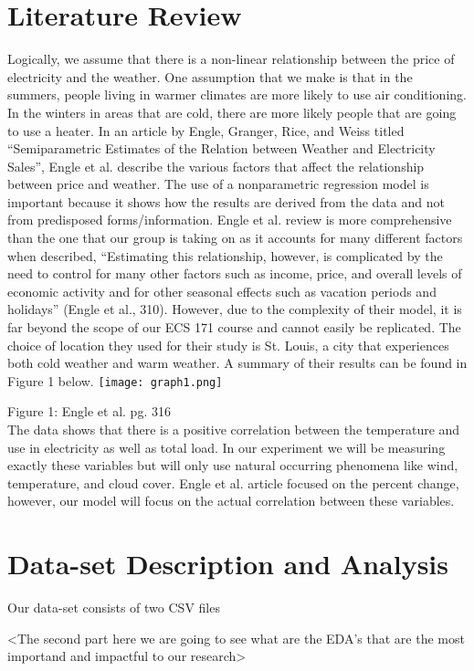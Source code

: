 \documentclass[10pt]{article}
\begin{document}
\section{Literature Review}\label{sec:2}
Logically, we assume that there is a non-linear relationship between the price of electricity and the weather. One assumption that we make is that in the summers, people living in warmer climates are more likely to use air conditioning. In the winters in areas that are cold, there are more likely people that are going to use a heater. In an article by Engle, Granger, Rice, and Weiss titled “Semiparametric Estimates of the Relation between Weather and Electricity Sales”, Engle et al. describe the various factors that affect the relationship between price and weather. The use of a nonparametric regression model is important because it shows how the results are derived from the data and not from predisposed forms/information. Engle et al. review is more comprehensive than the one that our group is taking on as it accounts for many different factors when described, “Estimating this relationship, however, is complicated by the need to control for many other factors such as income, price, and overall levels of economic activity and for other seasonal effects such as vacation periods and holidays” (Engle et al., 310). However, due to the complexity of their model, it is far beyond the scope of our ECS 171 course and cannot easily be replicated. The choice of location they used for their study is St. Louis, a city that experiences both cold weather and warm weather. A summary of their results can be found in Figure 1 below.
\texttt{[image: graph1.png]}

Figure 1: Engle et al. pg. 316
\\The data shows that there is a positive correlation between the temperature and use in electricity as well as total load. In our experiment we will be measuring exactly these variables but will only use natural occurring phenomena like wind, temperature, and cloud cover. Engle et al. article focused on the percent change, however, our model will focus on the actual correlation between these variables.


\section{Data-set Description and Analysis}\label{sec:3}
Our data-set consists of two CSV files 

<The second part here we are going to see what are the EDA's that are
the most importand and impactful to our research>
\end{document}
